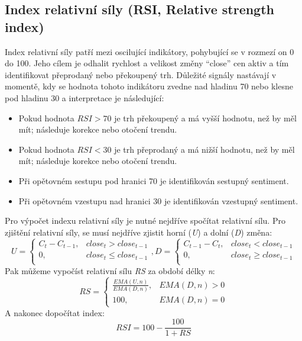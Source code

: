\subsection{Index relativní síly (RSI, Relative strength index)}
Index relativní síly patří mezi oscilující indikátory, pohybující se v rozmezí on 0 do 100. Jeho cílem je odhalit rychlost a velikost změny \enquote{close} cen aktiv a tím identifikovat
přeprodaný nebo překoupený trh. Důležité signály nastávají v momentě, kdy se hodnota tohoto indikátoru zvedne nad hladinu 70 nebo klesne pod hladinu 30 a interpretace je následující:
\begin{itemize}
    \item Pokud hodnota $RSI > 70$ je trh překoupený a má vyšší hodnotu, než by měl mít; následuje korekce nebo otočení trendu.
    \item Pokud hodnota $RSI < 30$ je trh přeprodaný a má nižší hodnotu, než by měl mít; následuje korekce nebo otočení trendu.
    \item Při opětovném sestupu pod hranici 70 je identifikován sestupný sentiment.
    \item Při opětovném vzestupu nad hranici 30 je identifikován vzestupný sentiment.
\end{itemize}

Pro výpočet indexu relativní síly je nutné nejdříve spočítat relativní sílu. Pro zjištění relativní síly, se musí nejdříve zjistit horní (\emph{U}) a dolní (\emph{D}) změna:
\begin{equation}
    U = \begin{cases}
        C_t - C_{t - 1}, & close_t > close_{t - 1}   \\
        0,               & close_t \le close_{t - 1} \\
    \end{cases}
    ,
    D = \begin{cases}
        C_{t - 1} - C_t, & close_t < close_{t - 1}   \\
        0,               & close_t \ge close_{t - 1} \\
    \end{cases}
    \label{eq:du}
\end{equation}
Pak můžeme vypočíst relativní sílu \emph{RS} za období délky \emph{n}:
\begin{equation}
    RS =
    \begin{cases}
        \frac{EMA(U, n)}{EMA(D, n)}, & {EMA(D, n)} > 0 \\
        100,                         & {EMA(D, n)} = 0
    \end{cases}
    \label{eq:rs}
\end{equation}
A nakonec dopočítat index:
\begin{equation}
    RSI = 100 - \frac{100}{1 + RS}
    \label{eq:rsi}
\end{equation}

